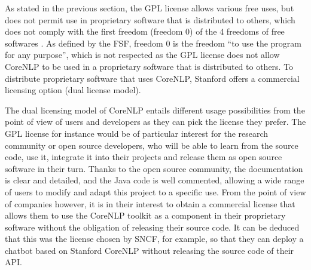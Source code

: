 \documentclass{classeENS}
\begin{document}
As stated in the previous section, the GPL license allows various free uses, but does not permit use in proprietary software that is distributed to others, which does not comply with the first freedom (freedom 0) of the 4 freedoms of free softwares \cite{FSFfreedoms}. As defined by the FSF, freedom 0 is the freedom “to use the program for any purpose”, which is not respected as the GPL license does not allow CoreNLP to be used in a proprietary software that is distributed to others. To distribute proprietary software that uses CoreNLP, Stanford offers a commercial licensing option (dual license model).

The dual licensing model of CoreNLP entails different usage possibilities from the point of view of users and developers as they can pick the license they prefer. The GPL license for instance would be of particular interest for the research community or open source developers, who will be able to learn from the source code, use it, integrate it into their projects and release them as open source software in their turn. Thanks to the open source community, the documentation is clear and detailed, and the Java code is well commented, allowing a wide range of users to modify and adapt this project to a specific use. From the point of view of companies however, it is in their interest to obtain a commercial license that allows them to use the CoreNLP toolkit as a component in their proprietary software without the obligation of releasing their source code. It can be deduced that this was the license chosen by SNCF, for example, so that they can deploy a chatbot based on Stanford CoreNLP without releasing the source code of their API.




\printbibliography %
\end{document}
